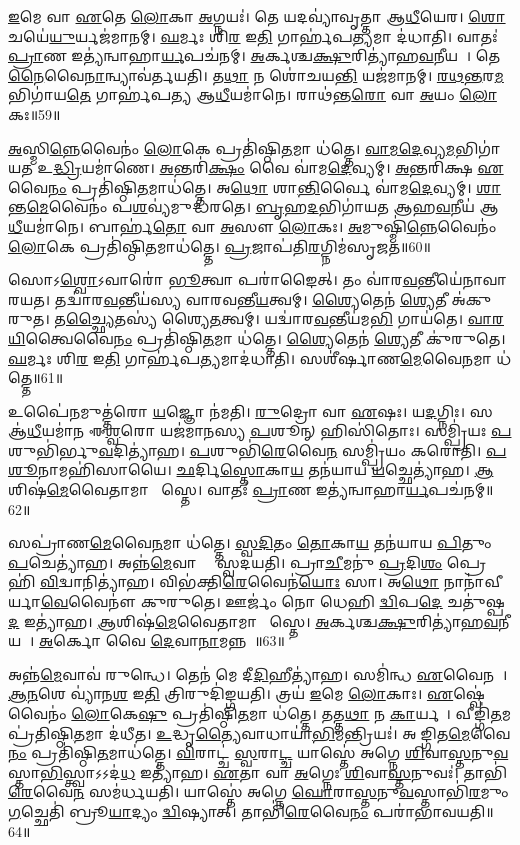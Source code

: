 \ul{𑌇}𑌮𑍇 𑌵𑌾 \ul{𑌏}𑌤𑍇 \ul{𑌲𑍋}𑌕𑌾 \ul{𑌅}𑌗𑍍𑌨𑌯𑌃॑।
𑌤𑍇 𑌯𑌦𑌵𑍍𑌯𑌾॑𑌵𑍃𑌤𑍍𑌤𑌾 𑌆\ul{𑌧𑍀}𑌯𑍇𑌰\sn{}।
\ul{𑌶𑍋}𑌚𑌯𑍇॑\ul{𑌯𑍁}𑌰𑍍𑌯𑌜॑𑌮𑌾𑌨𑌮𑍍।
\ul{𑌘}𑌰𑍍𑌮𑌃 𑌶𑌿\ul{𑌰} 𑌇\ul{𑌤𑌿} 𑌗𑌾𑌰𑍍\mbox{}𑌹॑𑌪\ul{𑌤𑍍𑌯}𑌮𑌾 𑌦॑𑌧𑌾𑌤𑌿।
𑌵𑌾𑌤𑌃॑ \ul{𑌪𑍍𑌰𑌾}𑌣 𑌇𑌤𑍍𑌯॑𑌨𑍍𑌵𑌾𑌹𑌾\ul{𑌰𑍍𑌯}𑌪𑌚॑𑌨𑌮𑍍।
\ul{𑌅}𑌰𑍍𑌕𑌶𑍍𑌚\ul{𑌕𑍍𑌷𑍁}𑌰𑌿𑌤𑍍𑌯𑌾॑𑌹\ul{𑌵}𑌨𑍀𑌯𑌮𑍍᳚।
𑌤𑍇\ul{𑌨𑍈}𑌵𑍈\ul{𑌨𑌾}𑌨𑍍𑌵𑍍𑌯𑌾𑌵॑𑌰𑍍𑌤𑌯𑌤𑌿।
𑌤\ul{𑌥𑌾} 𑌨 𑌶𑍋॑𑌚𑌯\ul{𑌨𑍍𑌤𑌿} 𑌯𑌜॑𑌮𑌾𑌨𑌮𑍍।
\ul{𑌰}\ul{𑌥}\ul{𑌨𑍍𑌤}𑌰\ul{𑌮}𑌭𑌿𑌗𑌾॑𑌯\ul{𑌤𑍇} 𑌗𑌾𑌰𑍍\mbox{}𑌹॑𑌪𑌤𑍍𑌯 𑌆\ul{𑌧𑍀}𑌯𑌮𑌾॑𑌨𑍇।
𑌰𑌾𑌥॑𑌨𑍍𑌤\ul{𑌰𑍋} 𑌵𑌾 \ul{𑌅}𑌯𑌂 \ul{𑌲𑍋}𑌕𑌃॥59॥

\ul{𑌅}𑌸𑍍𑌮𑌿\ul{𑌨𑍍𑌨𑍇}𑌵𑍈𑌨𑌂॑ \ul{𑌲𑍋}𑌕𑍇 𑌪𑍍𑌰𑌤𑌿॑\-𑌷𑍍𑌠𑌿\ul{𑌤}𑌮𑌾 𑌧॑𑌤𑍍𑌤𑍇।
\ul{𑌵𑌾}\ul{𑌮}\ul{𑌦𑍇}𑌵𑍍𑌯\ul{𑌮}𑌭𑌿𑌗𑌾॑𑌯𑌤 𑌉\ul{𑌦𑍍𑌧𑍍𑌰𑌿}𑌯𑌮𑌾॑𑌣𑍇।
\ul{𑌅}𑌨𑍍𑌤𑌰𑌿॑\ul{𑌕𑍍𑌷𑌂} 𑌵𑍈 𑌵𑌾॑𑌮\ul{𑌦𑍇}𑌵𑍍𑌯𑌮𑍍।
\ul{𑌅}𑌨𑍍𑌤𑌰𑌿॑𑌕𑍍𑌷 \ul{𑌏}𑌵𑍈\ul{𑌨𑌂} 𑌪𑍍𑌰𑌤𑌿॑\-𑌷𑍍𑌠𑌿\ul{𑌤}𑌮𑌾𑌧॑𑌤𑍍𑌤𑍇।
𑌅\ul{𑌥𑍋} 𑌶𑌾\ul{𑌨𑍍𑌤𑌿}𑌰𑍍𑌵𑍈 𑌵𑌾॑𑌮\ul{𑌦𑍇}𑌵𑍍𑌯𑌮𑍍।
\ul{𑌶𑌾}𑌨𑍍𑌤\ul{𑌮𑍇}𑌵𑍈𑌨𑌂॑ 𑌪\ul{𑌶}𑌵𑍍𑌯॑𑌮𑍁𑌦𑍍𑌧॑𑌰𑌤𑍇।
\ul{𑌬𑍃}𑌹\ul{𑌦}𑌭𑌿𑌗𑌾॑𑌯𑌤 𑌆𑌹\ul{𑌵}𑌨𑍀𑌯॑ 𑌆\ul{𑌧𑍀}𑌯𑌮𑌾॑𑌨𑍇।
𑌬𑌾𑌰𑍍\mbox{}𑌹॑\ul{𑌤𑍋} 𑌵𑌾 \ul{𑌅}𑌸𑍗 \ul{𑌲𑍋}𑌕𑌃।
\ul{𑌅}𑌮𑍁𑌷𑍍𑌮𑌿॑\ul{𑌨𑍍𑌨𑍇}𑌵𑍈𑌨𑌂॑ \ul{𑌲𑍋}𑌕𑍇 𑌪𑍍𑌰𑌤𑌿॑\-𑌷𑍍𑌠𑌿\ul{𑌤}𑌮𑌾𑌧॑𑌤𑍍𑌤𑍇।
\ul{𑌪𑍍𑌰}𑌜𑌾𑌪॑𑌤𑌿\ul{𑌰}𑌗𑍍𑌨𑌿𑌮॑𑌸𑍃𑌜𑌤॥60॥

𑌸𑍋𑌽\ul{𑌶𑍍𑌵𑍋}\-𑌽𑌵𑌾𑌰𑍋॑ \ul{𑌭𑍂}𑌤𑍍𑌵𑌾 𑌪𑌰𑌾॑𑌙𑍈𑌤𑍍।
𑌤𑌂 𑌵𑌾॑𑌰\ul{𑌵}𑌨𑍍𑌤𑍀𑌯𑍇॑𑌨𑌾𑌵𑌾𑌰𑌯𑌤।
𑌤𑌦𑍍𑌵𑌾॑𑌰\ul{𑌵}𑌨𑍍𑌤𑍀𑌯॑𑌸𑍍𑌯 𑌵𑌾𑌰𑌵𑌨𑍍𑌤𑍀\ul{𑌯}𑌤𑍍𑌵𑌮𑍍।
\ul{𑌶𑍍𑌯𑍈}𑌤𑍇𑌨॑ \ul{𑌶𑍍𑌯𑍇}𑌤𑍀 𑌅॑𑌕𑍁𑌰𑍁𑌤।
𑌤\ul{𑌚𑍍𑌛𑍍𑌯𑍈}𑌤𑌸𑍍𑌯॑ 𑌶𑍍𑌯𑍈\ul{𑌤}𑌤𑍍𑌵𑌮𑍍।
𑌯𑌦𑍍𑌵𑌾॑𑌰\ul{𑌵}𑌨𑍍𑌤𑍀𑌯॑𑌮\ul{𑌭𑌿} 𑌗𑌾𑌯॑𑌤𑍇।
\ul{𑌵𑌾}\ul{𑌰}\ul{𑌯𑌿}𑌤𑍍𑌵𑍈𑌵𑍈\ul{𑌨𑌂} 𑌪𑍍𑌰𑌤𑌿॑\-𑌷𑍍𑌠𑌿\ul{𑌤}𑌮𑌾 𑌧॑𑌤𑍍𑌤𑍇।
\ul{𑌶𑍍𑌯𑍈}𑌤𑍇𑌨॑ \ul{𑌶𑍍𑌯𑍇}𑌤𑍀 𑌕𑍁॑𑌰𑍁𑌤𑍇।
\ul{𑌘}𑌰𑍍𑌮𑌃 𑌶𑌿\ul{𑌰} 𑌇\ul{𑌤𑌿} 𑌗𑌾𑌰𑍍\mbox{}𑌹॑𑌪\ul{𑌤𑍍𑌯}𑌮𑌾𑌦॑𑌧𑌾𑌤𑌿।
𑌸𑌶𑍀॑𑌰𑍍\mbox{}𑌷𑌾𑌣\ul{𑌮𑍇}𑌵𑍈\ul{𑌨}𑌮𑌾 𑌧॑𑌤𑍍𑌤𑍇॥61॥

𑌉𑌪𑍈॑\ul{𑌨}𑌮𑍁𑌤𑍍𑌤॑𑌰𑍋 \ul{𑌯}𑌜𑍍𑌞𑍋 𑌨॑𑌮𑌤𑌿।
\ul{𑌰𑍁}𑌦𑍍𑌰𑍋 𑌵𑌾 \ul{𑌏}𑌷𑌃।
𑌯\ul{𑌦}𑌗𑍍𑌨𑌿𑌃।
𑌸 𑌆॑\ul{𑌧𑍀}𑌯𑌮𑌾॑𑌨 𑌈\ul{𑌶𑍍𑌵}𑌰𑍋 𑌯𑌜॑𑌮𑌾𑌨𑌸𑍍𑌯 \ul{𑌪}𑌶𑍂𑌨𑍍 𑌹𑌿𑌸𑌿॑𑌤𑍋𑌃।
𑌸𑌮𑍍𑌪𑍍𑌰𑌿॑𑌯𑌃 \ul{𑌪}𑌶𑍁𑌭𑌿॑𑌰𑍍𑌭𑍁\ul{𑌵}𑌦𑌿𑌤𑍍𑌯𑌾॑𑌹।
\ul{𑌪}𑌶𑍁𑌭𑌿॑\ul{𑌰𑍇}𑌵𑍈\ul{𑌨}\ul{} 𑌸𑌮𑍍𑌪𑍍𑌰𑌿॑𑌯𑌂 𑌕𑌰𑍋𑌤𑌿।
\ul{𑌪}\ul{𑌶𑍂}𑌨𑌾𑌮𑌹𑌿॑𑌸𑌾𑌯𑍈।
\ul{𑌛}𑌰𑍍𑌦𑌿\ul{𑌸𑍍𑌤𑍋}𑌕𑌾\ul{𑌯} 𑌤𑌨॑𑌯𑌾𑌯 \ul{𑌯}𑌚𑍍𑌛𑍇𑌤𑍍𑌯𑌾॑𑌹।
\ul{𑌆}𑌶𑌿𑌷॑\ul{𑌮𑍇}𑌵𑍈𑌤𑌾𑌮𑌾 𑌶𑌾᳚𑌸𑍍𑌤𑍇।
𑌵𑌾𑌤𑌃॑ \ul{𑌪𑍍𑌰𑌾}𑌣 𑌇𑌤𑍍𑌯॑𑌨𑍍𑌵𑌾𑌹𑌾\ul{𑌰𑍍𑌯}𑌪𑌚॑𑌨𑌮𑍍॥62॥

𑌸𑌪𑍍𑌰𑌾॑𑌣\ul{𑌮𑍇}𑌵𑍈\ul{𑌨}𑌮𑌾 𑌧॑𑌤𑍍𑌤𑍇।
\ul{𑌸𑍍𑌵}\ul{𑌦𑌿}𑌤𑌂 \ul{𑌤𑍋}𑌕𑌾\ul{𑌯} 𑌤𑌨॑𑌯𑌾𑌯 \ul{𑌪𑌿}𑌤𑍁𑌂 \ul{𑌪}𑌚𑍇𑌤𑍍𑌯𑌾॑𑌹।
𑌅𑌨𑍍𑌨॑\ul{𑌮𑍇}𑌵𑌾𑌸𑍍𑌮𑍈᳚ 𑌸𑍍𑌵𑌦𑌯𑌤𑌿।
𑌪𑍍𑌰𑌾\ul{𑌚𑍀}𑌮𑌨𑍁॑ \ul{𑌪𑍍𑌰}𑌦𑌿\ul{𑌶𑌂} 𑌪𑍍𑌰𑍇𑌹𑌿॑ \ul{𑌵𑌿}𑌦𑍍𑌵𑌾𑌨𑌿𑌤𑍍𑌯𑌾॑𑌹।
𑌵𑌿𑌭॑𑌕𑍍𑌤𑌿\ul{𑌰𑍇}𑌵𑍈𑌨॑\ul{𑌯𑍋𑌃} 𑌸𑌾।
𑌅\ul{𑌥𑍋} 𑌨𑌾𑌨𑌾॑𑌵𑍀𑌰𑍍𑌯𑌾\ul{𑌵𑍇}𑌵𑍈𑌨𑍗॑ 𑌕𑍁𑌰𑍁𑌤𑍇।
𑌊𑌰𑍍𑌜𑌂॑ 𑌨𑍋 𑌧𑍇𑌹𑌿 \ul{𑌦𑍍𑌵𑌿}𑌪\ul{𑌦𑍇} 𑌚𑌤𑍁॑𑌷𑍍𑌪\ul{𑌦} 𑌇𑌤𑍍𑌯𑌾॑𑌹।
\ul{𑌆}𑌶𑌿𑌷॑\ul{𑌮𑍇}𑌵𑍈𑌤𑌾𑌮𑌾 𑌶𑌾᳚𑌸𑍍𑌤𑍇।
\ul{𑌅}𑌰𑍍𑌕𑌶𑍍𑌚\ul{𑌕𑍍𑌷𑍁}𑌰𑌿𑌤𑍍𑌯𑌾॑𑌹\ul{𑌵}𑌨𑍀𑌯𑌮𑍍᳚।
\ul{𑌅}𑌰𑍍𑌕𑍋 𑌵𑍈 \ul{𑌦𑍇}𑌵𑌾\ul{𑌨𑌾}𑌮𑌨𑍍𑌨𑌮𑍍᳚॥63॥

𑌅𑌨𑍍𑌨॑\ul{𑌮𑍇}𑌵𑌾𑌵॑ 𑌰𑍁𑌨𑍍𑌧𑍇।
𑌤𑍇𑌨॑ 𑌮𑍇 𑌦𑍀\ul{𑌦𑌿}𑌹𑍀𑌤𑍍𑌯𑌾॑𑌹।
𑌸𑌮𑌿॑𑌨𑍍𑌧 \ul{𑌏}𑌵𑍈𑌨𑌮𑍍᳚।
\ul{𑌆}\ul{𑌨}𑌶𑍇 𑌵𑍍𑌯𑌾॑𑌨\ul{𑌶} 𑌇\ul{𑌤𑌿} 𑌤𑍍𑌰𑌿𑌰𑍁𑌦𑌿॑𑌙𑍍𑌗𑌯𑌤𑌿।
𑌤𑍍𑌰𑌯॑ \ul{𑌇}𑌮𑍇 \ul{𑌲𑍋}𑌕𑌾𑌃।
\ul{𑌏}𑌷𑍍𑌵𑍇॑𑌵𑍈𑌨𑌂॑ \ul{𑌲𑍋}𑌕𑍇\ul{𑌷𑍁} 𑌪𑍍𑌰𑌤𑌿॑\-𑌷𑍍𑌠𑌿\ul{𑌤}𑌮𑌾 𑌧॑𑌤𑍍𑌤𑍇।
𑌤𑌤𑍍𑌤\ul{𑌥𑌾} 𑌨 \ul{𑌕𑌾}𑌰𑍍𑌯𑌮𑍍᳚।
𑌵𑍀𑌙𑍍𑌗𑌿॑\ul{𑌤}𑌮𑌪𑍍𑌰॑𑌤𑌿𑌷𑍍𑌠𑌿\ul{𑌤}𑌮𑌾 𑌦॑𑌧𑍀𑌤।
\ul{𑌉}𑌦𑍍𑌧𑍃\ul{𑌤𑍍𑌯𑍈}𑌵𑌾𑌧𑌾𑌯𑌾॑\ul{𑌭𑌿}𑌮𑌨𑍍𑌤𑍍𑌰𑌿𑌯𑌃॑।
𑌅𑌵𑍀᳚𑌙𑍍𑌗𑌿𑌤\ul{𑌮𑍇}𑌵𑍈\ul{𑌨𑌂} 𑌪𑍍𑌰𑌤𑌿॑\-𑌷𑍍𑌠𑌿\ul{𑌤}𑌮𑌾𑌧॑𑌤𑍍𑌤𑍇।
\ul{𑌵𑌿}𑌰𑌾𑌟𑍍𑌚॑ \ul{𑌸𑍍𑌵}𑌰𑌾\ul{𑌟𑍍𑌚} 𑌯𑌾𑌸𑍍𑌤𑍇॑ 𑌅𑌗𑍍𑌨𑍇 \ul{𑌶𑌿}𑌵𑌾\ul{𑌸𑍍𑌤}𑌨𑍁\ul{𑌵}𑌸𑍍𑌤𑌾\ul{𑌭𑌿}𑌸𑍍𑌤𑍍𑌵𑌾\-𑌽𑌽𑌦॑\ul{𑌧} 𑌇𑌤𑍍𑌯𑌾॑𑌹।
\ul{𑌏}𑌤𑌾 𑌵𑌾 \ul{𑌅}𑌗𑍍𑌨𑍇𑌃 \ul{𑌶𑌿}𑌵𑌾\ul{𑌸𑍍𑌤}𑌨𑍁𑌵𑌃॑।
𑌤𑌾𑌭𑌿॑\ul{𑌰𑍇}𑌵𑍈\ul{𑌨}\ul{} 𑌸𑌮॑𑌰𑍍𑌧𑌯𑌤𑌿।
𑌯𑌾𑌸𑍍𑌤𑍇॑ 𑌅𑌗𑍍𑌨𑍇 \ul{𑌘𑍋}𑌰𑌾\ul{𑌸𑍍𑌤}𑌨𑍁\ul{𑌵}𑌸𑍍𑌤𑌾𑌭𑌿॑\ul{𑌰}𑌮𑍁𑌂 \ul{𑌗}𑌚𑍍𑌛𑍇𑌤𑌿॑ 𑌬𑍍𑌰𑍂\ul{𑌯𑌾}𑌦𑍍𑌯𑌂 \ul{𑌦𑍍𑌵𑌿}𑌷𑍍𑌯𑌾𑌤𑍍।
𑌤𑌾𑌭𑌿॑\ul{𑌰𑍇}𑌵𑍈\ul{𑌨𑌂} 𑌪𑌰𑌾॑𑌭𑌾𑌵𑌯𑌤𑌿॥64॥\anuvakamend[\ul{𑌲𑍋}𑌕𑍋॑\-𑌽𑌸𑍃𑌜𑌤𑍈\ul{𑌨}𑌮𑌾𑌧॑𑌤𑍍𑌤𑍇\-𑌽𑌨𑍍𑌵𑌾𑌹𑌾\ul{𑌰𑍍𑌯}𑌪𑌚॑𑌨𑌂 \ul{𑌦𑍇}𑌵𑌾\ul{𑌨𑌾}𑌮𑌨𑍍𑌨॑𑌮𑍇\ul{𑌨𑌂} 𑌪𑍍𑌰𑌤𑌿॑\-𑌷𑍍𑌠𑌿\ul{𑌤}𑌮𑌾𑌧॑\ul{𑌤𑍍𑌤𑍇} 𑌪𑌞𑍍𑌚॑ 𑌚]

